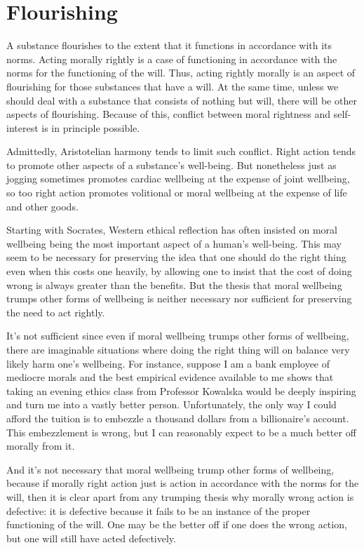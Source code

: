 \section{Flourishing}
A substance flourishes to the extent that it functions in accordance with its norms.  Acting morally rightly is
a case of functioning in accordance with the norms for the functioning of the will. Thus, acting rightly morally is an aspect of flourishing
for those substances that have a will. At the same time, unless we should deal with a substance that consists of nothing but will, there will be other
aspects of flourishing. Because of this, conflict between moral rightness and self-interest is in principle possible.

Admittedly, Aristotelian harmony tends to limit such conflict. Right action tends to promote other aspects of a substance's well-being. But nonetheless
just as jogging sometimes promotes cardiac wellbeing at the expense of joint wellbeing, so too right action promotes volitional or moral wellbeing at the expense
of life and other goods.

Starting with Socrates, Western ethical reflection has often insisted on moral wellbeing being the most important aspect of a human's
well-being. This may seem to be necessary for preserving the idea that one should do the right thing even when this costs one heavily,
by allowing one to insist that the cost of doing wrong is always greater than the benefits. But the thesis that moral wellbeing trumps
other forms of wellbeing is neither necessary nor sufficient for preserving the need to act rightly.

It's not sufficient since even if moral wellbeing trumps other forms of wellbeing, there are imaginable situations where doing the right thing will on balance
very likely harm one's wellbeing. For instance, suppose I am a bank employee of mediocre morals and the best empirical evidence available to
me shows that taking an evening ethics class from Professor Kowalska  would be deeply inspiring and turn me into a vastly better person.
Unfortunately, the only way I could afford the tuition is to embezzle a thousand dollars from a billionaire's account. This embezzlement is
wrong, but I can reasonably expect to be a much better off morally from it.

And it's not necessary that moral wellbeing trump other forms of wellbeing, because if morally right action just is action in accordance with
the norms for the will, then it is clear apart from any trumping thesis why morally wrong action is defective: it is defective because it
fails to be an instance of the proper functioning of the will. One may be the better off if one does the wrong action, but one will still
have acted defectively.

